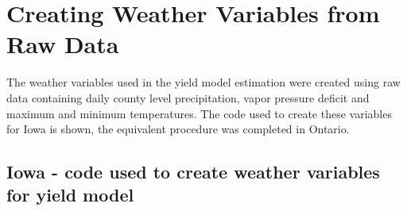 \section{Creating Weather Variables from Raw Data}

The weather variables used in the yield model estimation were created using raw data containing daily county level precipitation, vapor pressure deficit and maximum and minimum temperatures. The code used to create these variables for Iowa is shown, the equivalent procedure was completed in Ontario.

\subsection{Iowa - code used to create weather variables for yield model}

